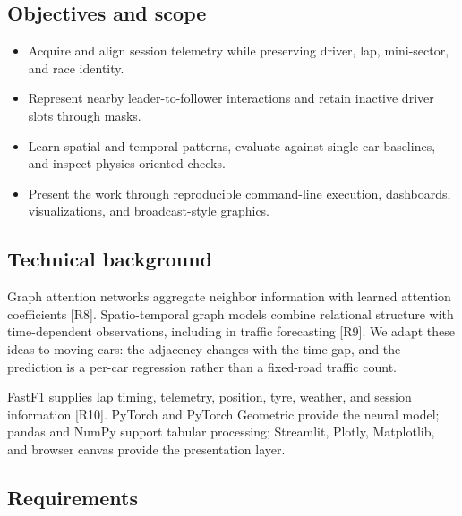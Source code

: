 \documentclass[11pt,a4paper,oneside]{report}
\begin{document}
\subsection*{Objectives and scope}

\begin{itemize}[leftmargin=2em]\item Acquire and align session telemetry while preserving driver, lap, mini-sector, and race identity.\end{itemize}

\begin{itemize}[leftmargin=2em]\item Represent nearby leader-to-follower interactions and retain inactive driver slots through masks.\end{itemize}

\begin{itemize}[leftmargin=2em]\item Learn spatial and temporal patterns, evaluate against single-car baselines, and inspect physics-oriented checks.\end{itemize}

\begin{itemize}[leftmargin=2em]\item Present the work through reproducible command-line execution, dashboards, visualizations, and broadcast-style graphics.\end{itemize}

\subsection*{Technical background}

Graph attention networks aggregate neighbor information with learned attention coefficients [R8]. Spatio-temporal graph models combine relational structure with time-dependent observations, including in traffic forecasting [R9]. We adapt these ideas to moving cars: the adjacency changes with the time gap, and the prediction is a per-car regression rather than a fixed-road traffic count.

FastF1 supplies lap timing, telemetry, position, tyre, weather, and session information [R10]. PyTorch and PyTorch Geometric provide the neural model; pandas and NumPy support tabular processing; Streamlit, Plotly, Matplotlib, and browser canvas provide the presentation layer.

\subsection*{Requirements}
\end{document}
